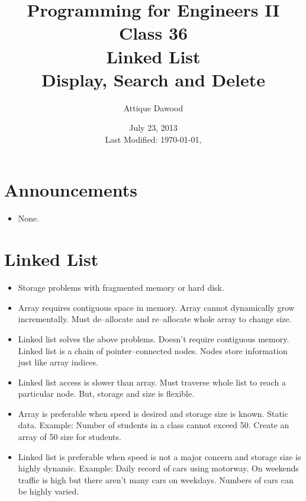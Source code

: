 \documentclass[12pt,a4paper]{article}
\title{\vspace{-2cm}Programming for Engineers II\\Class 36\\Linked List\\Display, Search and Delete}
\author{Attique Dawood}
\date{July 23, 2013\\[0.2cm] Last Modified: \today, \currenttime}
\begin{document}
\maketitle
\section{Announcements}
\begin{itemize}
\item None.
\end{itemize}
\section{Linked List}
\begin{itemize}
\item Storage problems with fragmented memory or hard disk.
\item Array requires contiguous space in memory. Array cannot dynamically grow incrementally. Must de--allocate and re--allocate whole array to change size.
\item Linked list solves the above problems. Doesn't require contiguous memory. Linked list is a chain of pointer--connected nodes. Nodes store information just like array indices.
\item Linked list access is slower than array. Must traverse whole list to reach a particular node. But, storage and size is flexible.
\item Array is preferable when speed is desired and storage size is known. Static data. Example: Number of students in a class cannot exceed 50. Create an array of 50 size for students.
\item Linked list is preferable when speed is not a major concern and storage size is highly dynamic. Example: Daily record of cars using motorway. On weekends traffic is high but there aren't many cars on weekdays. Numbers of cars can be highly varied.
\end{itemize}
\end{document}
